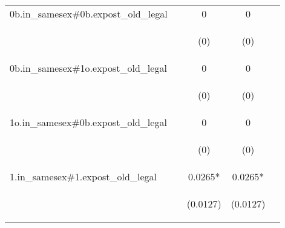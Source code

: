 \documentclass[]{article}
\begin{document}
\begin{center}
\begin{tabular}{lcccc}
0b.in\_samesex\#0b.expost\_old\_legal &  & 0 & 0 &  \\
\vspace{4pt} & \begin{footnotesize}\end{footnotesize} & \begin{footnotesize}(0)\end{footnotesize} & \begin{footnotesize}(0)\end{footnotesize} & \begin{footnotesize}\end{footnotesize} \\
0b.in\_samesex\#1o.expost\_old\_legal &  & 0 & 0 &  \\
\vspace{4pt} & \begin{footnotesize}\end{footnotesize} & \begin{footnotesize}(0)\end{footnotesize} & \begin{footnotesize}(0)\end{footnotesize} & \begin{footnotesize}\end{footnotesize} \\
1o.in\_samesex\#0b.expost\_old\_legal &  & 0 & 0 &  \\
\vspace{4pt} & \begin{footnotesize}\end{footnotesize} & \begin{footnotesize}(0)\end{footnotesize} & \begin{footnotesize}(0)\end{footnotesize} & \begin{footnotesize}\end{footnotesize} \\
1.in\_samesex\#1.expost\_old\_legal &  & 0.0265* & 0.0265* &  \\
\vspace{4pt} & \begin{footnotesize}\end{footnotesize} & \begin{footnotesize}(0.0127)\end{footnotesize} & \begin{footnotesize}(0.0127)\end{footnotesize} & \begin{footnotesize}\end{footnotesize} \\

\end{tabular}
\end{center}
\end{document}
